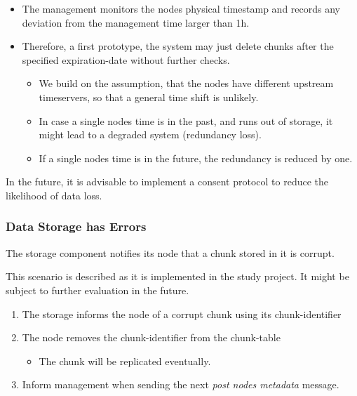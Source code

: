 \begin{itemize}
    \item The \gls{management} monitors the \glspl{node} physical timestamp and records any deviation from the \gls{management} time larger than 1h.
    \item Therefore, a first prototype, the system may just delete \glspl{chunk} after the specified \gls{expiration-date} without further checks.
        \begin{itemize}
            \item We build on the assumption, that the \glspl{node} have different upstream timeservers, so that a general time shift is unlikely.
            \item In case a single \gls{node}s time is in the past, and runs out of storage, it might lead to a degraded system (redundancy loss).
            \item If a single \gls{node}s time is in the future, the redundancy is reduced by one.
        \end{itemize}
\end{itemize}

In the future, it is advisable to implement a consent protocol to reduce the likelihood of data loss.

\subsubsection{Data Storage has Errors}\label{sec:scenario-storage-errors}
The \gls{storage} component notifies its \gls{node} that a \gls{chunk} stored in it is corrupt.

This scenario is described as it is implemented in the study project. It might be subject to further evaluation in the future.

\begin{enumerate}
    \item The \gls{storage} informs the \gls{node} of a corrupt \gls{chunk} using its \gls{chunk-identifier}
    \item The node removes the \gls{chunk-identifier} from the \gls{chunk-table}
        \begin{itemize}
            \item The \gls{chunk} will be replicated eventually.
        \end{itemize}
    \item Inform \gls{management} when sending the next \emph{post nodes metadata} message.
\end{enumerate}


